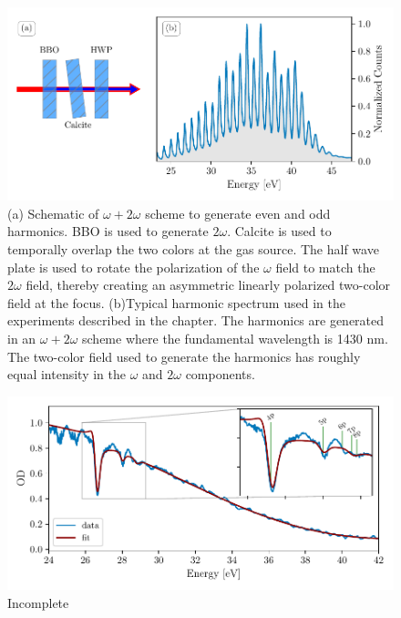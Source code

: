 \begin{figure}
	\centering
	\includegraphics[width=1.0\textwidth]{figures/ATS/harmonic_spectrum_2.pdf}
	\caption[Typical harmonic spectrum used in ATS experiments]{(a) Schematic of $\omega + 2\omega$ scheme to generate even and odd harmonics.  BBO is used to generate $2\omega$. Calcite is used to temporally overlap the two colors at the gas source.  The half wave plate is used to rotate the polarization of the $\omega$ field to match the $2\omega$ field, thereby creating an asymmetric linearly polarized two-color field at the focus. (b)Typical harmonic spectrum used in the experiments described in the chapter.  The harmonics are generated in an $\omega + 2\omega$ scheme where the fundamental wavelength is 1430 nm.  The two-color field used to generate the harmonics has roughly equal intensity in the $\omega$ and $2\omega$ components.}
	\label{fig:harmonic_spectrum}
\end{figure}

\begin{figure}
	\centering
	\includegraphics[width=1.0\textwidth]{figures/ATS/fano_fit.pdf}
	\caption{Incomplete}
	\label{fig:fano_fit}
\end{figure}


